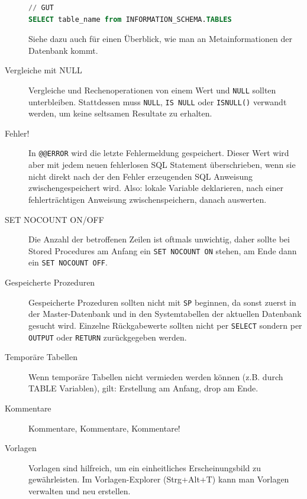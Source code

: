 \documentclass[12pt,ngerman,a4paper,index=totoc,twoside]{scrartcl}
\newcommand{\sql}[1]{\texttt{#1}}
\begin{document}
\begin{description}
\begin{center}
\begin{minipage}{0.75\textwidth}
\begin{lstlisting}[language={SQL},caption={Zugriffe auf Metainformationen der Datenbank},label={sysobjects1}]
// GUT
SELECT table_name from INFORMATION_SCHEMA.TABLES
\end{lstlisting}
\end{minipage}
\end{center} 

Siehe dazu auch \cite{katalogsichten} für einen Überblick, wie man an Metainformationen der Datenbank kommt. 
	
\item[Vergleiche mit NULL] 
	
Vergleiche und Rechenoperationen von einem Wert und \sql{NULL} sollten unterbleiben. Stattdessen muss \sql{NULL}, \sql{IS NULL} oder \sql{ISNULL()} verwandt werden, um keine seltsamen Resultate zu erhalten.
	
\item[Fehler!] 
	
In \sql{@@ERROR} wird die letzte Fehlermeldung gespeichert. Dieser Wert wird aber mit jedem neuen fehlerlosen SQL Statement überschrieben, wenn sie nicht direkt nach der den Fehler erzeugenden SQL Anweisung zwischengespeichert wird. Also: lokale Variable deklarieren, nach einer fehlerträchtigen Anweisung zwischenspeichern, danach auswerten. 


\item[SET NOCOUNT ON/OFF] 
	
Die Anzahl der betroffenen Zeilen ist oftmals unwichtig, daher sollte bei Stored Procedures am Anfang ein \sql{SET NOCOUNT ON} stehen, am Ende dann ein \sql{SET NOCOUNT OFF}. 
	
\item[Gespeicherte Prozeduren] 
	
Gespeicherte Prozeduren sollten nicht mit \sql{SP\textunderscore} beginnen, da sonst zuerst in der Master-Datenbank und in den Systemtabellen der aktuellen Datenbank gesucht wird. Einzelne Rückgabewerte sollten nicht per \sql{SELECT} sondern per \sql{OUTPUT} oder \sql{RETURN} zurückgegeben werden.  
	
\item[Temporäre Tabellen] 
	
Wenn temporäre Tabellen nicht vermieden werden können (z.B. durch TABLE Variablen), gilt: Erstellung am Anfang, drop am Ende. 
	
\item[Kommentare] 
	
Kommentare, Kommentare, Kommentare!
	
\item[Vorlagen] 

Vorlagen sind hilfreich, um ein einheitliches Erscheinungsbild zu gewährleisten. Im Vorlagen-Explorer (Strg+Alt+T) kann man Vorlagen verwalten und neu erstellen.

\end{description}
\end{document}
